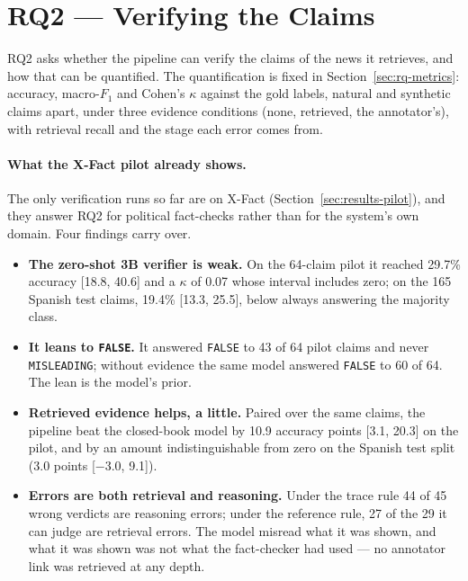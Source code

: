
\section{RQ2 --- Verifying the Claims}
\label{sec:results-rq2}

RQ2 asks whether the pipeline can verify the claims of the news it
retrieves, and how that can be quantified. The quantification is fixed
in Section~\ref{sec:rq-metrics}: accuracy, macro-$F_1$ and Cohen's
$\kappa$ against the gold labels, natural and synthetic claims apart,
under three evidence conditions (none, retrieved, the annotator's),
with retrieval recall and the stage each error comes from.

\paragraph{What the X-Fact pilot already shows.} The only verification
runs so far are on X-Fact (Section~\ref{sec:results-pilot}), and they
answer RQ2 for political fact-checks rather than for the system's own
domain. Four findings carry over.

\begin{itemize}
    \item \textbf{The zero-shot 3B verifier is weak.} On the 64-claim
    pilot it reached 29.7\% accuracy [18.8, 40.6] and a $\kappa$ of 0.07
    whose interval includes zero; on the 165 Spanish test claims, 19.4\%
    [13.3, 25.5], below always answering the majority class.
    \item \textbf{It leans to \texttt{FALSE}.} It answered
    \texttt{FALSE} to 43 of 64 pilot claims and never
    \texttt{MISLEADING}; without evidence the same model answered
    \texttt{FALSE} to 60 of 64. The lean is the model's prior.
    \item \textbf{Retrieved evidence helps, a little.} Paired over the
    same claims, the pipeline beat the closed-book model by 10.9 accuracy
    points [3.1, 20.3] on the pilot, and by an amount indistinguishable
    from zero on the Spanish test split (3.0 points [$-3.0$, 9.1]).
    \item \textbf{Errors are both retrieval and reasoning.} Under the
    trace rule 44 of 45 wrong verdicts are reasoning errors; under the
    reference rule, 27 of the 29 it can judge are retrieval errors. The
    model misread what it was shown, and what it was shown was not what
    the fact-checker had used --- no annotator link was retrieved at any
    depth.
\end{itemize}

